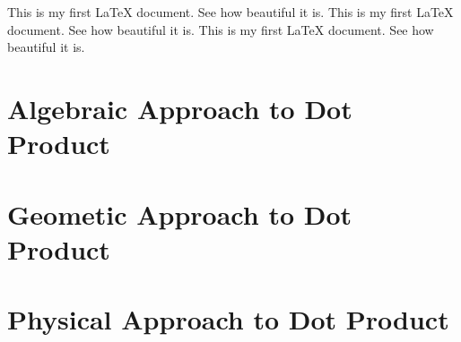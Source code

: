 This is my first LaTeX document. See how beautiful it is. 
This is my first LaTeX document. See how beautiful it is.
This is my first LaTeX document. See how beautiful it is.
\section{Algebraic Approach to Dot Product}

\section{Geometic Approach to Dot Product}

\section{Physical Approach to Dot Product}
